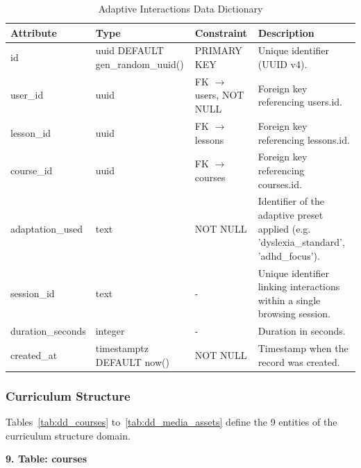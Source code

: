 \documentclass[12pt, oneside]{article} %
\newcommand{\tabbreak}{\hyphenpenalty=200\exhyphenpenalty=200\tolerance=4000\hbadness=10000\hspace{0pt}}
\begin{document}
\begin{table}[H]
\caption{Adaptive Interactions Data Dictionary}
\label{tab:dd_adaptive_interactions}
\vspace{-4mm}
\begin{center}
\renewcommand{\arraystretch}{1.15}
\scriptsize
\begin{tabular}{|>{\raggedright\arraybackslash\tabbreak}p{2.67cm}|>{\raggedright\arraybackslash\tabbreak}p{2.93cm}|>{\raggedright\arraybackslash\tabbreak}p{2.67cm}|>{\raggedright\arraybackslash\tabbreak}p{4.51cm}|}
\hline
\textbf{Attribute} & \textbf{Type} & \textbf{Constraint} & \textbf{Description} \\ \hline
id & uuid DEFAULT gen\_random\_uuid() & PRIMARY KEY & Unique identifier (UUID v4). \\ \hline
user\_id & uuid & FK $\rightarrow$ users, NOT NULL & Foreign key referencing users.id. \\ \hline
lesson\_id & uuid & FK $\rightarrow$ lessons & Foreign key referencing lessons.id. \\ \hline
course\_id & uuid & FK $\rightarrow$ courses & Foreign key referencing courses.id. \\ \hline
adaptation\_used & text & NOT NULL & Identifier of the adaptive preset applied (e.g. 'dyslexia\_standard', 'adhd\_focus'). \\ \hline
session\_id & text & - & Unique identifier linking interactions within a single browsing session. \\ \hline
duration\_seconds & integer & - & Duration in seconds. \\ \hline
created\_at & timestamptz DEFAULT now() & NOT NULL & Timestamp when the record was created. \\ \hline
\end{tabular}
\end{center}
\end{table}

\subsubsection{Curriculum Structure}

Tables~\ref{tab:dd_courses} to~\ref{tab:dd_media_assets} define the 9 entities of the curriculum structure domain.

\textbf{9. Table: courses}
\end{document}

